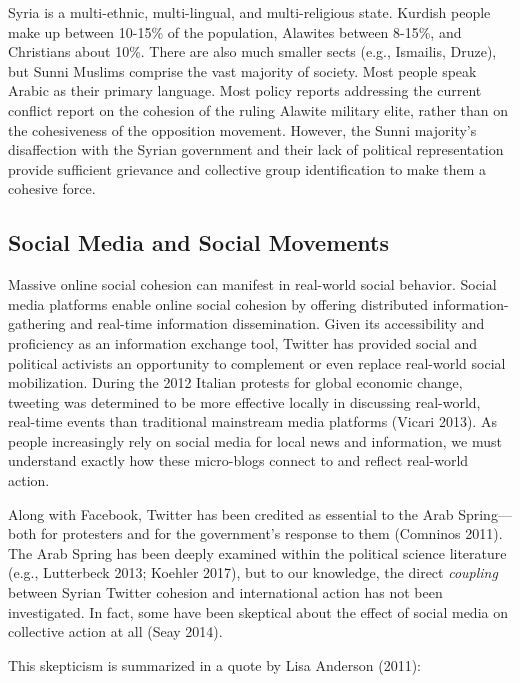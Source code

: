 \documentclass[english,man]{apa6}
\begin{document}
Syria is a multi-ethnic, multi-lingual, and multi-religious state. Kurdish
people make up between 10-15\% of the population, Alawites between 8-15\%, and
Christians about 10\%. There are also much smaller sects (e.g., Ismailis, Druze),
but Sunni Muslims comprise the vast majority of society. Most people speak
Arabic as their primary language. Most policy reports addressing the current
conflict report on the cohesion of the ruling Alawite military elite, rather
than on the cohesiveness of the opposition movement. However, the Sunni
majority's disaffection with the Syrian government and their lack of political
representation provide sufficient grievance and collective group identification
to make them a cohesive force.

\hypertarget{social-media-and-social-movements}{%
\subsection{Social Media and Social Movements}\label{social-media-and-social-movements}}

Massive online social cohesion can manifest in real-world social behavior.
Social media platforms enable online social cohesion by offering distributed
information-gathering and real-time information dissemination. Given its
accessibility and proficiency as an information exchange tool, Twitter has
provided social and political activists an opportunity to complement or even
replace real-world social mobilization. During the 2012 Italian protests for
global economic change, tweeting was determined to be more effective locally in
discussing real-world, real-time events than traditional mainstream media
platforms (Vicari 2013). As people increasingly rely on social media for
local news and information, we must understand exactly how these micro-blogs
connect to and reflect real-world action.

Along with Facebook, Twitter has been credited as essential to the Arab
Spring---both for protesters and for the government's response to them
(Comninos 2011). The Arab Spring has been deeply examined within the
political science literature (e.g., Lutterbeck 2013; Koehler 2017), but to our knowledge, the direct \emph{coupling} between
Syrian Twitter cohesion and international action has not been investigated. In
fact, some have been skeptical about the effect of social media on collective
action at all (Seay 2014).

This skepticism is summarized in a quote by Lisa Anderson (2011):
\end{document}
